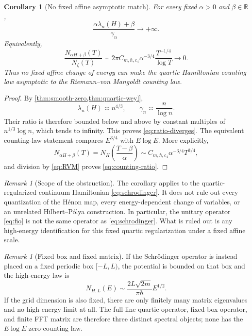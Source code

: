 \documentclass[11pt]{article}
\newtheorem{corollary}[theorem]{Corollary}
\theoremstyle{definition}
\theoremstyle{remark}
\newtheorem{remark}[theorem]{Remark}
\newcommand{\R}{\mathbb R}
\begin{document}
\begin{corollary}[No fixed affine asymptotic match]\label{cor:weyl-obstruction}
For every fixed $\alpha>0$ and $\beta\in\R$,
\begin{equation}\label{eq:ratio-diverges}
    \frac{\alpha\lambda_n(H)+\beta}{\gamma_n}
    \longrightarrow+\infty.
\end{equation}
Equivalently,
\begin{equation}\label{eq:counting-ratio}
    \frac{N_{\alpha H+\beta}(T)}{N_\zeta(T)}
    \sim 2\pi C_{m,\hbar,c_4}\alpha^{-3/4}
       \frac{T^{-1/4}}{\log T}
    \longrightarrow0.
\end{equation}
Thus no fixed affine change of energy can make the quartic Hamiltonian counting law asymptotic to the Riemann--von Mangoldt counting law.
\end{corollary}

\begin{proof}
By \cref{thm:smooth-zero,thm:quartic-weyl},
\[
    \lambda_n(H)\asymp n^{4/3},
    \qquad
    \gamma_n\asymp\frac{n}{\log n}.
\]
Their ratio is therefore bounded below and above by constant multiples of $n^{1/3}\log n$, which tends to infinity.  This proves \eqref{eq:ratio-diverges}.  The equivalent counting-law statement compares $E^{3/4}$ with $E\log E$.
More explicitly,
\[
    N_{\alpha H+\beta}(T)
    =N_H\left(\frac{T-\beta}{\alpha}\right)
    \sim C_{m,\hbar,c_4}\alpha^{-3/4}T^{3/4},
\]
and division by \eqref{eq:RVM} proves \eqref{eq:counting-ratio}.
\end{proof}

\begin{remark}[Scope of the obstruction]\label{rem:weyl-scope}
The corollary applies to the quartic-regularized continuum Hamiltonian \eqref{eq:schrodinger}.  It does not rule out every quantization of the H\'{e}non map, every energy-dependent change of variables, or an unrelated Hilbert--P\'{o}lya construction.  In particular, the unitary operator \eqref{eq:fio} is not the same operator as \eqref{eq:schrodinger}.  What is ruled out is any high-energy identification for this fixed quartic regularization under a fixed affine scale.
\end{remark}

\begin{remark}[Fixed box and fixed matrix]\label{rem:box}
If the Schr\"odinger operator is instead placed on a fixed periodic box $[-L,L)$, the potential is bounded on that box and the high-energy law is
\[
    N_{H,L}(E)\sim
    \frac{2L\sqrt{2m}}{\pi\hbar}E^{1/2}.
\]
If the grid dimension is also fixed, there are only finitely many matrix eigenvalues and no high-energy limit at all.  The full-line quartic operator, fixed-box operator, and finite FFT matrix are therefore three distinct spectral objects; none has the $E\log E$ zero-counting law.
\end{remark}
\end{document}
